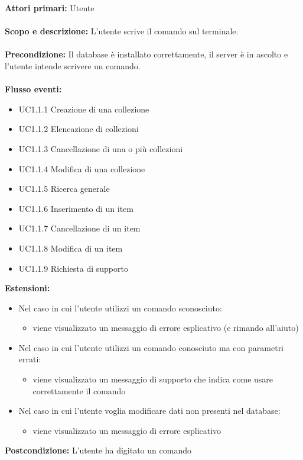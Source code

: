 \documentclass{scalatekids-article}
\begin{document}
\textbf{Attori primari:} Utente\\ \\
\textbf{Scopo e descrizione:} L’utente scrive il comando sul terminale.\\ \\
\textbf{Precondizione:} Il database è installato correttamente, il server è in ascolto e l'utente intende scrivere un comando.\\ \\
\textbf{Flusso eventi:}
\begin{itemize}
\item UC1.1.1 Creazione di una collezione
\item UC1.1.2 Elencazione di collezioni
\item UC1.1.3 Cancellazione di una o più collezioni
\item UC1.1.4 Modifica di una collezione
\item UC1.1.5 Ricerca generale
\item UC1.1.6 Inserimento di un item
\item UC1.1.7 Cancellazione di un item
\item UC1.1.8 Modifica di un item
\item UC1.1.9 Richiesta di supporto
\end{itemize}
\textbf{Estensioni:}
\begin{itemize}
\item Nel caso in cui l'utente utilizzi un comando sconosciuto:
  \begin{itemize}
  \item viene visualizzato un messaggio di errore esplicativo (e rimando all'aiuto)
  \end{itemize}
\item Nel caso in cui l'utente utilizzi un comando conosciuto ma con parametri errati:
  \begin{itemize}
  \item viene visualizzato un messaggio di supporto che indica come usare correttamente il comando
  \end{itemize}
\item Nel caso in cui l'utente voglia modificare dati non presenti nel database:
  \begin{itemize}
  \item viene visualizzato un messaggio di errore esplicativo
  \end{itemize}
\end{itemize}
\textbf{Postcondizione:} L'utente ha digitato un comando
\end{document}
